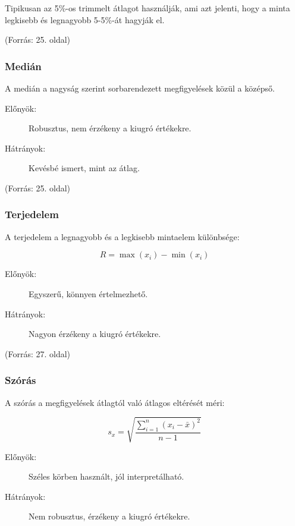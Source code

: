 \documentclass[a4paper,12pt]{article}
\begin{document}
    Tipikusan az 5\%-os trimmelt átlagot használják, ami azt jelenti, hogy a minta legkisebb és legnagyobb 5-5\%-át hagyják el.

    (Forrás: 25. oldal)

    \subsubsection{Medián}

    A medián a nagyság szerint sorbarendezett megfigyelések közül a középső.

    \begin{description}
        \item[Előnyök:] Robusztus, nem érzékeny a kiugró értékekre.
        \item[Hátrányok:] Kevésbé ismert, mint az átlag.
    \end{description}

    (Forrás: 25. oldal)

    \subsubsection{Terjedelem}

    A terjedelem a legnagyobb és a legkisebb mintaelem különbsége:

    \begin{equation}
        R = \max(x_i) - \min(x_i)
    \end{equation}

    \begin{description}
        \item[Előnyök:] Egyszerű, könnyen értelmezhető.
        \item[Hátrányok:] Nagyon érzékeny a kiugró értékekre.
    \end{description}

    (Forrás: 27. oldal)

    \subsubsection{Szórás}

    A szórás a megfigyelések átlagtól való átlagos eltérését méri:

    \begin{equation}
        s_x = \sqrt{\frac{\sum_{i=1}^n (x_i - \bar{x})^2}{n-1}}
    \end{equation}

    \begin{description}
        \item[Előnyök:] Széles körben használt, jól interpretálható.
        \item[Hátrányok:] Nem robusztus, érzékeny a kiugró értékekre.
    \end{description}
\end{document}

